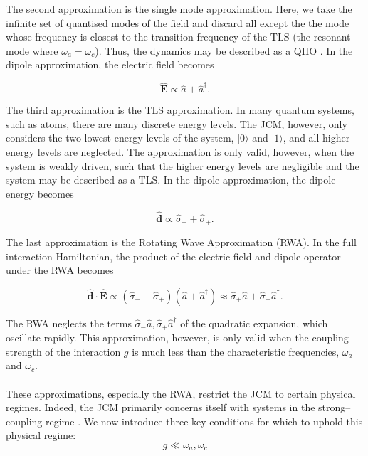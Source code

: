 \documentclass[11pt]{article}
\begin{document}
The second approximation is the single mode approximation. Here, we take the infinite set of quantised modes of the field and discard all except the the mode whose frequency is closest to the transition frequency of the TLS (the resonant mode where $\omega_a = \omega_c$). Thus, the dynamics may be described as a QHO \cite{General2024-JCM_relevance}. In the dipole approximation, the electric field becomes

\begin{equation*}
    \boldsymbol{\hat{E}}  \propto \hat{a} + \hat{a}^\dagger.
\end{equation*}


The third approximation is the TLS approximation. In many quantum systems, such as atoms, there are many discrete energy levels. The JCM, however, only considers the two lowest energy levels of the system, $|0\rangle$ and $|1\rangle$, and all higher energy levels are neglected. The approximation is only valid, however, when the system is weakly driven, such that the higher energy levels are negligible and the system may be described as a TLS. In the dipole approximation, the dipole energy becomes

\begin{equation*}
    \boldsymbol{\hat{d}}  \propto \hat{\sigma}_{-} + \hat{\sigma}_{+}.
\end{equation*}

The last approximation is the Rotating Wave Approximation (RWA). In the full interaction Hamiltonian, the product of the electric field and dipole operator under the RWA becomes

\begin{equation}
    \boldsymbol{\hat{d}} \cdot \boldsymbol{\hat{E}} \propto (\hat{\sigma}_{-} + \hat{\sigma}_{+})(\hat{a} + \hat{a}^\dagger) \approx \hat{\sigma}_{+}\hat{a} +\hat{\sigma}_{-}\hat{a}^\dagger. 
\end{equation}

The RWA neglects the terms $\hat{\sigma}_{-}\hat{a}, \hat{\sigma}_{+}\hat{a}^\dagger$ of the quadratic expansion, which oscillate rapidly. This approximation, however, is only valid when the coupling strength of the interaction $g$ is much less than the characteristic frequencies, $\omega_a$ and $\omega_c$. \\
\\
These approximations, especially the RWA, restrict the JCM to certain physical regimes. Indeed, the JCM primarily concerns itself with systems in the strong--coupling regime \cite{General2024-JCM_relevance}. We now introduce three key conditions for which to uphold this physical regime:
\begin{equation} \label{JCM_condition_g<omega}
    g \ll \omega_a, \omega_c 
\end{equation} 
\end{document}

